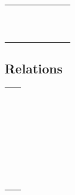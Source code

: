 \documentclass[11pt, a4paper, oneside]{article}
\theoremstyle{Plain}
\theoremstyle{Definition}
\theoremstyle{Remark}
\begin{document}
\begin{appendix}
	\begin{tabular}{*8l}
	\X\dotplus      &\X\smallsetminus \\ \X\Cap        &\X\Cup               \\
	\X\barwedge     &\X\veebar      \\ \X\doublebarwedge&\X\boxminus        \\
	\X\boxtimes     &\X\boxdot      \\ \X\boxplus     &\X\divideontimes     \\
	\X\ltimes       &\X\rtimes      \\ \X\leftthreetimes&\X\rightthreetimes \\
	\X\curlywedge   &\X\curlyvee    \\ \X\circleddash &\X\circledast        \\
	\X\circledcirc  &\X\centerdot   \\ \X\intercal
	\end{tabular}

	\subsection{{} Relations \showfamily}

	\begin{tabular}{*2l}
	\X\leqslant    \\\X\lesssim    \\
	\X\approxeq    \\\X\lll        \\
	\X\lesseqgtr   \\\X\doteqdot   \\
	\X\fallingdotseq\\\X\backsimeq  \\
	\X\Subset      \\\X\preccurlyeq\\
	\X\precsim     \\\X\vartriangleleft\\
	\X\vDash      \\\X\smallsmile \\
	\X\bumpeq      \\\X\geqq       \\
	\X\eqslantgtr  \\\X\gtrapprox  \\
	\X\ggg         \\\X\gtreqless  \\
	\X\eqcirc      \\\X\triangleq  \\
	\X\thickapprox \\\X\Supset     \\
	\X\succcurlyeq \\\X\succsim    \\
	\X\vartriangleright\\\X\Vdash      \\
	\X\shortparallel\\\X\pitchfork  \\
	\X\blacktriangleleft \\\X\backepsilon\\
	\X\because
	\end{tabular}


\end{appendix}
\end{document}
